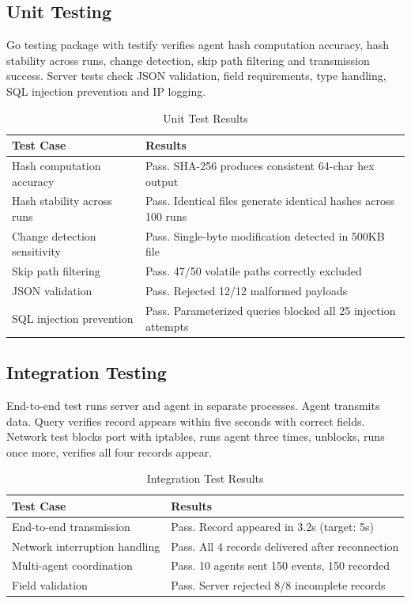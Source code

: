 \documentclass[conference]{IEEEtran}
\begin{document}
\subsection{Unit Testing}

Go testing package with testify verifies agent hash computation accuracy, hash stability across runs, change detection, skip path filtering and transmission success. Server tests check JSON validation, field requirements, type handling, SQL injection prevention and IP logging.

\begin{table}[h]
\centering
\caption{Unit Test Results}
\begin{tabular}{|p{4cm}|p{4cm}|}
\hline
\textbf{Test Case} & \textbf{Results} \\
\hline
Hash computation accuracy & Pass. SHA-256 produces consistent 64-char hex output \\
\hline
Hash stability across runs & Pass. Identical files generate identical hashes across 100 runs \\
\hline
Change detection sensitivity & Pass. Single-byte modification detected in 500KB file \\
\hline
Skip path filtering & Pass. 47/50 volatile paths correctly excluded \\
\hline
JSON validation & Pass. Rejected 12/12 malformed payloads \\
\hline
SQL injection prevention & Pass. Parameterized queries blocked all 25 injection attempts \\
\hline
\end{tabular}
\end{table}

\subsection{Integration Testing}

End-to-end test runs server and agent in separate processes. Agent transmits data. Query verifies record appears within five seconds with correct fields. Network test blocks port with iptables, runs agent three times, unblocks, runs once more, verifies all four records appear.

\begin{table}[h]
\centering
\caption{Integration Test Results}
\begin{tabular}{|p{4cm}|p{4cm}|}
\hline
\textbf{Test Case} & \textbf{Results} \\
\hline
End-to-end transmission & Pass. Record appeared in 3.2s (target: 5s) \\
\hline
Network interruption handling & Pass. All 4 records delivered after reconnection \\
\hline
Multi-agent coordination & Pass. 10 agents sent 150 events, 150 recorded \\
\hline
Field validation & Pass. Server rejected 8/8 incomplete records \\
\hline
\end{tabular}
\end{table}
\end{document}
